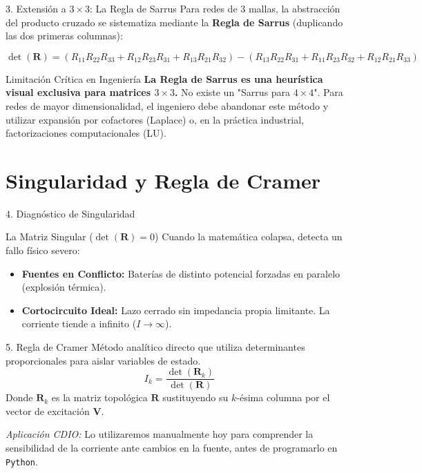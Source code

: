 \documentclass[aspectratio=169]{beamer}
\begin{document}
\begin{frame}{3. Extensión a $3\times3$: La Regla de Sarrus}
    Para redes de 3 mallas, la abstracción del producto cruzado se sistematiza mediante la \textbf{Regla de Sarrus} (duplicando las dos primeras columnas):
    
    \begin{equation*}
        \det(\mathbf{R}) = (R_{11}R_{22}R_{33} + R_{12}R_{23}R_{31} + R_{13}R_{21}R_{32}) - (R_{13}R_{22}R_{31} + R_{11}R_{23}R_{32} + R_{12}R_{21}R_{33})
    \end{equation*}
    
    \begin{alertblock}{Limitación Crítica en Ingeniería}
        \textbf{La Regla de Sarrus es una heurística visual exclusiva para matrices $3\times3$.} No existe un "Sarrus para $4\times4$". Para redes de mayor dimensionalidad, el ingeniero debe abandonar este método y utilizar expansión por cofactores (Laplace) o, en la práctica industrial, factorizaciones computacionales (LU).
    \end{alertblock}
\end{frame}

\section{Singularidad y Regla de Cramer}

\begin{frame}{4. Diagnóstico de Singularidad}
    \begin{block}{La Matriz Singular ($\det(\mathbf{R}) = 0$)}
        Cuando la matemática colapsa, detecta un fallo físico severo:
        \begin{itemize}
            \item \textbf{Fuentes en Conflicto:} Baterías de distinto potencial forzadas en paralelo (explosión térmica).
            \item \textbf{Cortocircuito Ideal:} Lazo cerrado sin impedancia propia limitante. La corriente tiende a infinito ($I \to \infty$).
        \end{itemize}
    \end{block}
\end{frame}

\begin{frame}{5. Regla de Cramer}
    Método analítico directo que utiliza determinantes proporcionales para aislar variables de estado.
    \begin{equation*}
        I_k = \frac{\det(\mathbf{R}_k)}{\det(\mathbf{R})}
    \end{equation*}
    Donde $\mathbf{R}_k$ es la matriz topológica $\mathbf{R}$ sustituyendo su $k$-ésima columna por el vector de excitación $\mathbf{V}$. 
    
    \vspace{0.2cm}
    \textit{Aplicación CDIO:} Lo utilizaremos manualmente hoy para comprender la sensibilidad de la corriente ante cambios en la fuente, antes de programarlo en \texttt{Python}.
\end{frame}
\end{document}
